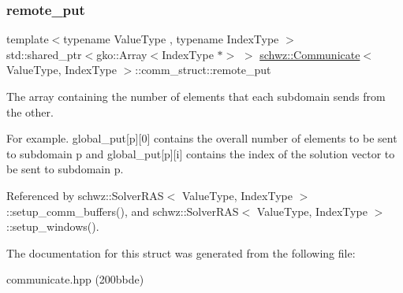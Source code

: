 \subsubsection{\texorpdfstring{remote\+\_\+put}{remote\_put}}
{\footnotesize\ttfamily template$<$typename Value\+Type , typename Index\+Type $>$ \\
std\+::shared\+\_\+ptr$<$gko\+::\+Array$<$Index\+Type $\ast$$>$ $>$ \hyperlink{classschwz_1_1Communicate}{schwz\+::\+Communicate}$<$ Value\+Type, Index\+Type $>$\+::comm\+\_\+struct\+::remote\+\_\+put}



The array containing the number of elements that each subdomain sends from the other. 

For example. global\+\_\+put\mbox{[}p\mbox{]}\mbox{[}0\mbox{]} contains the overall number of elements to be sent to subdomain p and global\+\_\+put\mbox{[}p\mbox{]}\mbox{[}i\mbox{]} contains the index of the solution vector to be sent to subdomain p. 

Referenced by schwz\+::\+Solver\+R\+A\+S$<$ Value\+Type, Index\+Type $>$\+::setup\+\_\+comm\+\_\+buffers(), and schwz\+::\+Solver\+R\+A\+S$<$ Value\+Type, Index\+Type $>$\+::setup\+\_\+windows().



The documentation for this struct was generated from the following file\+:\begin{DoxyCompactItemize}
\item 
communicate.\+hpp (200bbde)\end{DoxyCompactItemize}
